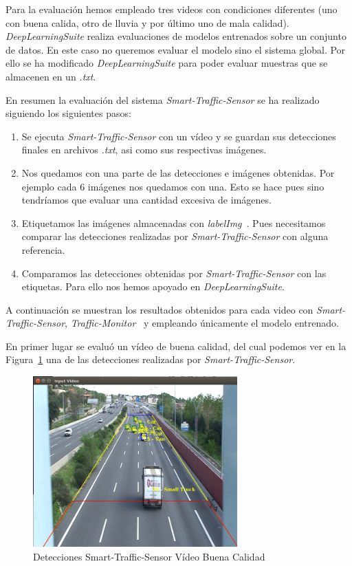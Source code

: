 Para la evaluación hemos empleado tres videos con condiciones diferentes (uno con buena calida, otro de lluvia y por último uno de mala calidad). \textit{DeepLearningSuite} realiza evaluaciones de modelos entrenados sobre un conjunto de datos. En este caso no queremos evaluar el modelo sino el sistema global. Por ello se ha modificado \textit{DeepLearningSuite} para poder evaluar muestras que se almacenen en un \textit{.txt}. 

En resumen la evaluación del sistema \textit{Smart-Traffic-Sensor} se ha realizado siguiendo los siguientes pasos:

\begin{enumerate}
    \item Se ejecuta \textit{Smart-Traffic-Sensor} con un vídeo y se guardan sus detecciones finales en archivos \textit{.txt}, asi como sus respectivas imágenes.
    \item Nos quedamos con una parte de las detecciones e imágenes obtenidas. Por ejemplo cada 6 imágenes nos quedamos con una. Esto se hace pues sino tendríamos que evaluar una cantidad excesiva de imágenes.
    \item Etiquetamos las imágenes almacenadas con \textit{labelImg}~\cite{labelimg}. Pues necesitamos comparar las detecciones realizadas por \textit{Smart-Traffic-Sensor} con alguna referencia.
    \item Comparamos las detecciones obtenidas por \textit{Smart-Traffic-Sensor} con las etiquetas. Para ello nos hemos apoyado en \textit{DeepLearningSuite}.
\end{enumerate}


A continuación se muestran los resultados obtenidos para cada video con \textit{Smart-Traffic-Sensor}, \textit{Traffic-Monitor}~\cite{redo_tesis} y empleando únicamente el modelo entrenado.

En primer lugar se evaluó un vídeo de buena calidad, del cual podemos ver en la Figura~\ref{fig.video_buena_calidad} una de las detecciones realizadas por \textit{Smart-Traffic-Sensor}.

\begin{figure}[H] 
\begin{center}
	\includegraphics[width=0.7\textwidth]{figures/Experimentos/sts_buena.png}
   \caption{Detecciones Smart-Traffic-Sensor Vídeo Buena Calidad}
	\label{fig.video_buena_calidad}
\end{center}
\end{figure}

